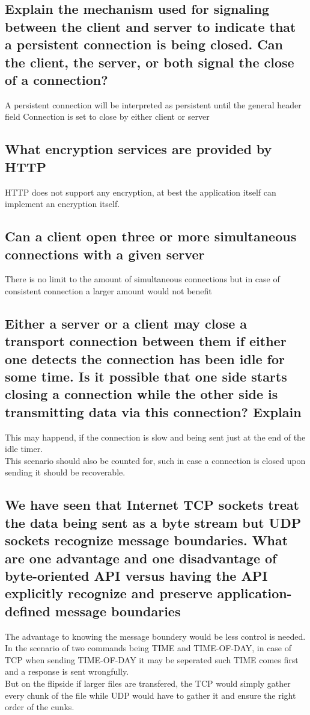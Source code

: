 \documentclass[12pt, a4paper]{article}
\begin{document}
		\subsection{Explain the mechanism used for signaling between the client and server to indicate that a persistent connection is being closed. Can the client, the server, or both signal the close of a connection?}
			A persistent connection will be interpreted as persistent until the general header field Connection is set to close by either client or server
		\subsection{What encryption services are provided by HTTP}
			HTTP does not support any encryption, at best the application itself can implement an encryption itself.
		\subsection{Can a client open three or more simultaneous connections with a given server}
			There is no limit to the amount of simultaneous connections but in case of consistent connection a larger amount would not benefit
		\subsection{Either a server or a client may close a transport connection between them if either one detects the connection has been idle for some time. Is it possible that one side starts closing a connection while the other side is transmitting data via this connection? Explain}
			This may happend, if the connection is slow and being sent just at the end of the idle timer.\\
			This scenario should also be counted for, such in case a connection is closed upon sending it should be recoverable.
		\subsection{We have seen that Internet TCP sockets treat the data being sent as a byte stream but UDP sockets recognize message boundaries. What are one advantage and one disadvantage of byte-oriented API versus having the API explicitly recognize and preserve application-defined message boundaries}
			The advantage to knowing the message boundery would be less control is needed.\\
			In the scenario of two commands being TIME and TIME-OF-DAY, in case of TCP when sending TIME-OF-DAY it may be seperated such TIME comes first and a response is sent wrongfully.\\
			But on the flipside if larger files are transfered, the TCP would simply gather every chunk of the file while UDP would have to gather it and ensure the right order of the cunks.
\end{document}
